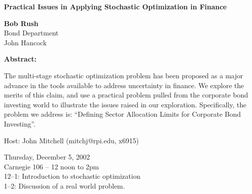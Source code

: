 \documentclass[12pt]{article}
\begin{document}
\begin{center}
{\bf\Large\bf
Practical Issues in Applying Stochastic Optimization in Finance}
\end{center}

\begin{center}
{\bf\large\bf
Bob Rush} \\
Bond Department  \\
John Hancock
\end{center}

\begin{center}
{\bf\large\bf Abstract:}
\end{center}

The multi-stage stochastic optimization problem has been proposed as a major
advance in the tools available to address uncertainty in finance.  We
explore the merits of this claim, and use a practical problem pulled from
the corporate bond investing world to illustrate the issues raised in our
exploration.  Specifically, the problem we address is: ``Defining Sector
Allocation Limits for Corporate Bond Investing''.

\vspace{0.5in}

Host: John Mitchell (mitchj@rpi.edu, x6915)

\begin{center}
Thursday, December 5, 2002  \\
Carnegie 106 -- 12 noon to 2pm  \\
12--1: Introduction to stochastic optimization  \\
1--2: Discussion of a real world problem.
\end{center}
\end{document}
